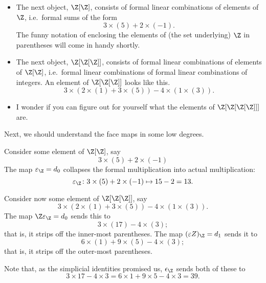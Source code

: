 \documentclass[main.tex]{subfiles}
\begin{document}
\begin{example}
\begin{itemize}
    \item The next object, $\Z[\Z]$, consists of formal linear combinations of elements of $\Z$, i.e.\ formal sums of the form
      \begin{equation*}
        3\times(5) + 2\times(-1).
      \end{equation*}
      The funny notation of enclosing the elements of (the set underlying) $\Z$ in parentheses will come in handy shortly.

    \item The next object, $\Z[\Z[\Z]]$, consists of formal linear combinations of elements of $\Z[\Z]$, i.e.\ formal linear combinations of formal linear combinations of integers. An element of $\Z[\Z[\Z]]$ looks like this.
      \begin{equation*}
        3\times(2\times(1) + 3\times(5)) - 4\times(1\times(3)).
      \end{equation*}

    \item I wonder if you can figure out for yourself what the elements of $\Z[\Z[\Z[\Z]]]$ are.
  \end{itemize}

  Next, we should understand the face maps in some low degrees.

  Consider some element of $\Z[\Z]$, say
  \begin{equation*}
    3\times(5) + 2\times(-1)
  \end{equation*}
  The map $\varepsilon_{\Z} = d_{0}$ collapses the formal multiplication into actual multiplication:
  \begin{equation*}
    \varepsilon_{\Z}\colon 3\times(5) + 2\times(-1) \mapsto 15 - 2 = 13. 
  \end{equation*}

  Consider now some element of $\Z[\Z[\Z]]$, say
  \begin{equation*}
    3\times(2\times(1) + 3\times(5)) - 4\times(1\times(3)).
  \end{equation*}
  The map $\Z\varepsilon_{\Z} = d_{0}$ sends this to
  \begin{equation*}
    3\times(17) - 4\times(3);
  \end{equation*}
  that is, it strips off the inner-most parentheses. The map $(\varepsilon Z)_{\Z} = d_{1}$ sends it to
  \begin{equation*}
    6\times(1) + 9\times(5) - 4\times(3);
  \end{equation*}
  that is, it strips off the outer-most parentheses.

  Note that, as the simplicial identities promised us, $\epsilon_{\Z}$ sends both of these to
  \begin{equation*}
    3\times 17 - 4\times 3 = 6\times 1 + 9\times5 - 4\times3 = 39.
  \end{equation*}
\end{example}
\end{document}
